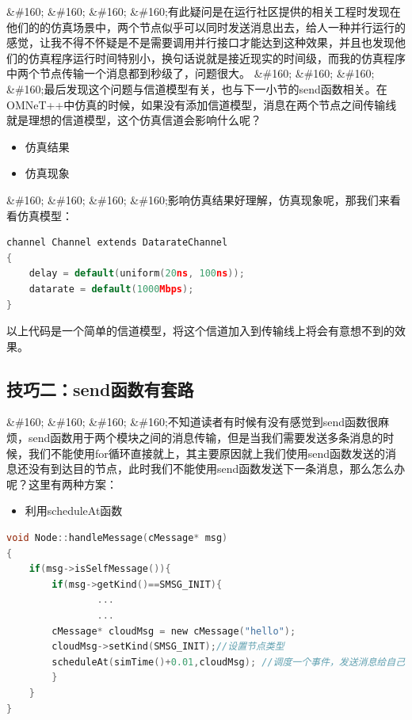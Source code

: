 \&\#160; \&\#160; \&\#160; \&\#160;有此疑问是在运行社区提供的相关工程时发现在他们的的仿真场景中，两个节点似乎可以同时发送消息出去，给人一种并行运行的感觉，让我不得不怀疑是不是需要调用并行接口才能达到这种效果，并且也发现他们的仿真程序运行时间特别小，换句话说就是接近现实的时间级，而我的仿真程序中两个节点传输一个消息都到秒级了，问题很大。
\&\#160; \&\#160; \&\#160; \&\#160;最后发现这个问题与信道模型有关，也与下一小节的send函数相关。在OMNeT++中仿真的时候，如果没有添加信道模型，消息在两个节点之间传输线就是理想的信道模型，这个仿真信道会影响什么呢？

\begin{itemize}
\item 仿真结果

\item 仿真现象

\end{itemize}

\&\#160; \&\#160; \&\#160; \&\#160;影响仿真结果好理解，仿真现象呢，那我们来看看仿真模型：

\begin{lstlisting}[language=c,caption=My]
channel Channel extends DatarateChannel
{
    delay = default(uniform(20ns, 100ns));
    datarate = default(1000Mbps);
}
\end{lstlisting}

以上代码是一个简单的信道模型，将这个信道加入到传输线上将会有意想不到的效果。

\subsection{技巧二：send函数有套路}
\label{技巧二：send函数有套路}

\&\#160; \&\#160; \&\#160; \&\#160;不知道读者有时候有没有感觉到send函数很麻烦，send函数用于两个模块之间的消息传输，但是当我们需要发送多条消息的时候，我们不能使用for循环直接就上，其主要原因就上我们使用send函数发送的消息还没有到达目的节点，此时我们不能使用send函数发送下一条消息，那么怎么办呢？这里有两种方案：

\begin{itemize}
\item 利用scheduleAt函数

\end{itemize}

\begin{lstlisting}[language=c,caption=My]
void Node::handleMessage(cMessage* msg)
{
    if(msg->isSelfMessage()){
        if(msg->getKind()==SMSG_INIT){
                ...
                ...
		cMessage* cloudMsg = new cMessage("hello");
		cloudMsg->setKind(SMSG_INIT);//设置节点类型
		scheduleAt(simTime()+0.01,cloudMsg); //调度一个事件，发送消息给自己
        }
    }
}
\end{lstlisting}

